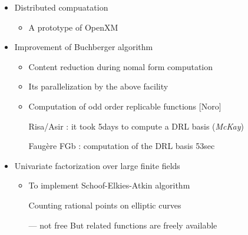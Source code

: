 \begin{slide}{}

\begin{itemize}
\item Distributed compuatation

\begin{itemize}
\item A prototype of OpenXM
\end{itemize}

\item Improvement of Buchberger algorithm

\begin{itemize}
\item Content reduction during nomal form computation

\item Its parallelization by the above facility

\item Computation of odd order replicable functions [Noro]

Risa/Asir : it took 5days to compute a DRL basis ({\it McKay})

Faug\`ere FGb : computation of the DRL basis 53sec
\end{itemize}


\item Univariate factorization over large finite fields

\begin{itemize}
\item To implement Schoof-Elkies-Atkin algorithm 

Counting rational points on elliptic curves

--- not free But related functions are freely available
\end{itemize}
\end{itemize}

\end{slide}


